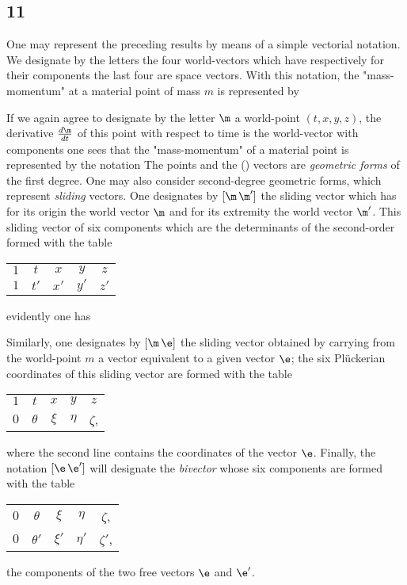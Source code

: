 \subsection*{11}
One may represent the preceding results by means of a simple vectorial notation. We designate by the letters
the four world-vectors which have respectively for their components
the last four are space vectors. With this notation, the "mass-momentum" at a material point of mass $m$ is represented by

If we again agree to designate by the letter $\m$ a world-point $(t,x,y,z)$, the derivative $\frac{d\m}{dt}$ of this point with respect to time is the world-vector with components
one sees that the "mass-momentum" of a material point is represented by the notation
The points and the () vectors are \textit{geometric forms} of the first degree. One may also consider second-degree geometric forms, which represent \textit{sliding} vectors. One designates by $[\m\,\m']$ the sliding vector which has for its origin the world vector $\m$ and for its extremity the world vector $\m'$. This sliding vector of six  components which are the determinants of the second-order formed with the table

\begin{tabular}{ccccc}
  $1$ & $t$ & $x$ & $y$ & $z$ \\
  $1$ & $t'$ & $x'$ & $y'$ & $z'$
\end{tabular}
evidently one has

Similarly, one designates by $[\m\,\e]$ the sliding vector obtained by carrying from the world-point $m$ a vector equivalent to a given vector $\e$; the six Pl\"uckerian coordinates of this sliding vector are formed with the table
\begin{tabular}{ccccc}
  $1$ & $t$ & $x$ & $y$ & $z$ \\
  $0$ & $\theta$ & $\xi$ & $\eta$ & $\zeta$,
\end{tabular}
where the second line contains the coordinates of the vector $\e$. Finally, the notation $[\e\,\e']$ will designate the \textit{bivector} whose six components are formed with the table
\begin{tabular}{ccccc}
  $0$ & $\theta$ & $\xi$ & $\eta$ & $\zeta$, \\
  $0$ & $\theta'$ & $\xi'$ & $\eta'$ & $\zeta'$,
\end{tabular}
the components of the two free vectors $\e$ and $\e'$.

